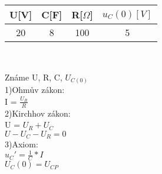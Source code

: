 \documentclass[12pt]{article}
\begin{document}
\begin{center}
\begin{tabular}{| c | c | c | c |}
\hline
U[V] & C[F] & R[$\Omega$] & $u_{C}(0)[V]$ \\
\hline
20 & 8 & 100 & 5\\
\hline
\end{tabular}\\
\end{center}
Známe U, R, C, $U_{C(0)}$\\
1)Ohmův zákon:\\ I = $\frac{U_{R}}{R}$\\
2)Kirchhov zákon:\\ U = $U_{R}+U_{C}$\\ $U-U_{C}-U_{R}=0$\\
3)Axiom:\\$u_{C}'=\frac{1}{C}*I$\\ $U_{C}(0)=U_{CP}$\\
\end{document}
